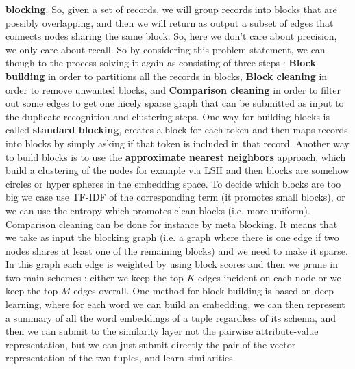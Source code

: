 \documentclass[11pt]{article}
\begin{document}
\textbf{blocking}. So, given a set of records, we will group records into blocks that are possibly overlapping, and then we will return as output a subset of edges that connects nodes sharing the same block. So, here we don't care about precision, we only care about recall. So by considering this problem statement, we can though to the process solving it again as consisting of three steps : \textbf{Block building} in order to partitions all the records in blocks, \textbf{Block cleaning} in order to remove unwanted blocks, and \textbf{Comparison cleaning} in order to filter out some edges to get one nicely sparse graph that can be submitted as input to the duplicate recognition and clustering steps. One way for building blocks is called \textbf{standard blocking}, creates a block for each token and then maps records into blocks by simply asking if that token is included in that record. Another way to build blocks is to use the \textbf{approximate nearest neighbors} approach, which build a clustering of the nodes for example via LSH and then blocks are somehow circles or hyper spheres in the embedding space. To decide which blocks are too big we case use TF-IDF of the corresponding term (it promotes small blocks), or we can use the entropy which promotes clean blocks (i.e. more uniform). Comparison cleaning can be done for instance by meta blocking. It means that we take as input the blocking graph (i.e. a graph where there is one edge if two nodes shares at least one of the remaining blocks) and we need to make it sparse. In this graph each edge is weighted by using block scores and then we prune in two main schemes : either we keep the top $K$ edges incident on each node or we keep the top $M$ edges overall. One method for block building is based on deep learning, where for each word we can build an embedding, we can then represent a summary of all the word embeddings of a tuple regardless of its schema, and then we can submit to the similarity layer not the pairwise attribute-value representation, but we can just submit directly the pair of the vector representation of the two tuples, and learn similarities.
\end{document}

